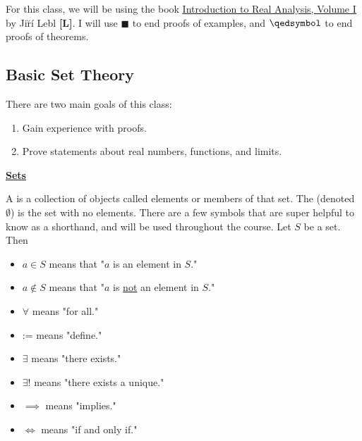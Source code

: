 
For this class, we will be using the book \href{https://www.jirka.org/ra/realanal.pdf}{\underline{Introduction to Real Analysis, Volume I}} by Ji\u r\'i Lebl \textbf{[L]}. I will use $\blacksquare$ to end proofs of examples, and $\qedsymbol$ to end proofs of theorems.

\subsection*{Basic Set Theory}


\begin{remark}
There are two main goals of this class:
\begin{enumerate}
    \item Gain experience with proofs.
    \item Prove statements about real numbers, functions, and limits.
\end{enumerate}
\end{remark}

\noindent \underline{\textbf{Sets}}

A  is a collection of objects called elements or members of that set. 
The  (denoted $\emptyset$) is the set with no elements. There are a few symbols that are super helpful to know as a shorthand, and will be used throughout the course. Let $S$ be a set. Then
\begin{multicols}{2}
\begin{itemize}
    \item $a\in S$ means that "$a$ is an element in $S$."
    \item $a\notin S$ means that "$a$ is \underline{not} an element in $S$."
    \item $\forall$ means "for all."
    \item := means "define."
    \item $\exists$ means "there exists."
    \item $\exists!$ means "there exists a unique."
    \item $\implies$ means "implies."
    \item $\iff$ means "if and only if."
\end{itemize}
\end{multicols}

